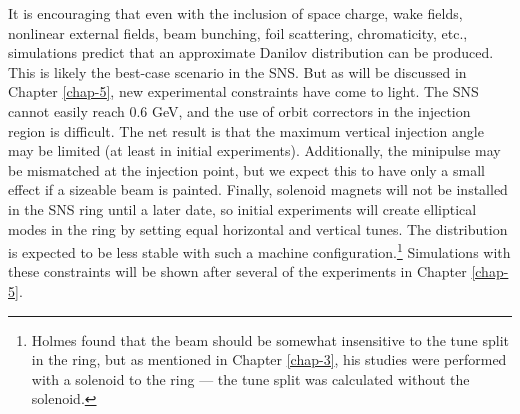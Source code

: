 It is encouraging that even with the inclusion of space charge, wake fields, nonlinear external fields, beam bunching, foil scattering, chromaticity, etc., simulations predict that an approximate Danilov distribution can be produced. This is likely the best-case scenario in the SNS. But as will be discussed in Chapter \ref{chap-5}, new experimental constraints have come to light. The SNS cannot easily reach 0.6 GeV, and the use of orbit correctors in the injection region is difficult. The net result is that the maximum vertical injection angle may be limited (at least in initial experiments). Additionally, the minipulse may be mismatched at the injection point, but we expect this to have only a small effect if a sizeable beam is painted. Finally, solenoid magnets will not be installed in the SNS ring until a later date, so initial experiments will create elliptical modes in the ring by setting equal horizontal and vertical tunes. The distribution is expected to be less stable with such a machine configuration.\footnote{Holmes found that the beam should be somewhat insensitive to the tune split in the ring, but as mentioned in Chapter \ref{chap-3}, his studies were performed with a solenoid to the ring — the tune split was calculated without the solenoid.} Simulations with these constraints will be shown after several of the experiments in Chapter \ref{chap-5}.
